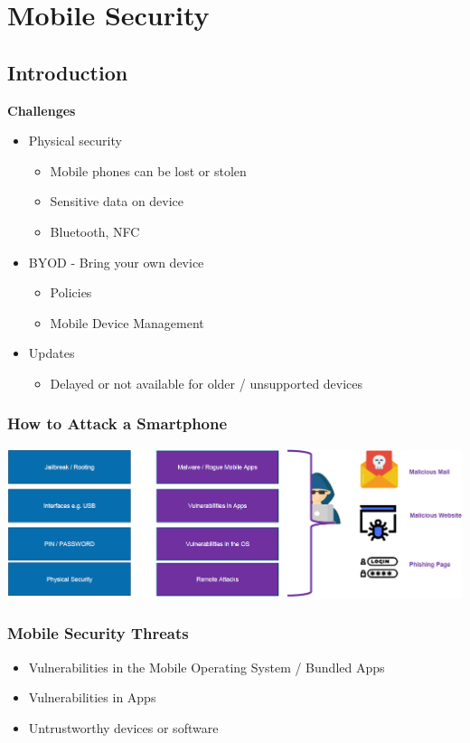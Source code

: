 \usepackage{graphicx}%

\section{Mobile Security}
\subsection{Introduction}
\textbf{Challenges}
\begin{itemize}
    \item Physical security
    \begin{itemize}
        \item Mobile phones can be lost or stolen
        \item Sensitive data on device
        \item Bluetooth, NFC
    \end{itemize}
    \item BYOD - Bring your own device
    \begin{itemize}
        \item Policies
        \item Mobile Device Management
    \end{itemize}
    \item Updates
    \begin{itemize}
        \item Delayed or not available for older / unsupported devices
    \end{itemize}
\end{itemize}

\subsubsection{How to Attack a Smartphone}
\includegraphics[width=\linewidth]{../img/attack_smartphone.png}

\subsubsection{Mobile Security Threats}
\begin{itemize}
    \item Vulnerabilities in the Mobile Operating System / Bundled Apps
    \item Vulnerabilities in Apps
    \item Untrustworthy devices or software
\end{itemize}

